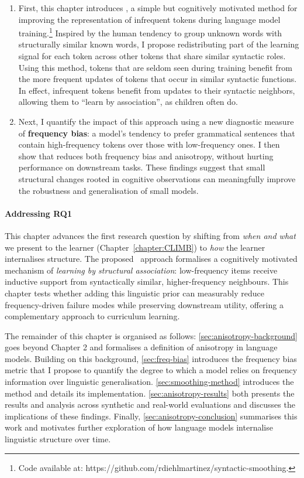 \begin{enumerate}
    \item First, this chapter introduces \smoothing, a simple but cognitively motivated method for improving the representation of infrequent tokens during language model training.\footnote{Code available at: https://github.com/rdiehlmartinez/syntactic-smoothing.} Inspired by the human tendency to group unknown words with structurally similar known words, I propose redistributing part of the learning signal for each token across other tokens that share similar syntactic roles. Using this method, tokens that are seldom seen during training benefit from the more frequent updates of tokens that occur in similar syntactic functions.  In effect, infrequent tokens benefit from updates to their syntactic neighbors, allowing them to ``learn by association'', as children often do.
    \item Next, I quantify the impact of this approach using a new diagnostic measure of \textbf{frequency bias}: a model's tendency to prefer grammatical sentences that contain high-frequency tokens over those with low-frequency ones. I then show that \smoothing reduces both frequency bias and anisotropy, without hurting performance on downstream tasks. These findings suggest that small structural changes rooted in cognitive observations can meaningfully improve the robustness and generalisation of small models.
     
\end{enumerate}

\paragraph{Addressing RQ1} This chapter advances the first research question by shifting from \emph{when and what} we present to the learner (Chapter~\ref{chapter:CLIMB}) to \emph{how} the learner internalises structure. The proposed \smoothing\ approach formalises a cognitively motivated mechanism of \emph{learning by structural association}: low-frequency items receive inductive support from syntactically similar, higher-frequency neighbours. This chapter tests whether adding this linguistic prior can measurably reduce frequency-driven failure modes while preserving downstream utility, offering a complementary approach to curriculum learning.

\vspace{1em}

The remainder of this chapter is organised as follows: \cref{sec:anisotropy-background} goes beyond Chapter 2 and formalises a definition of anisotropy in language models. Building on this background, \cref{sec:freq-bias} introduces the frequency bias metric that I propose to quantify the degree to which a model relies on frequency information over linguistic generalisation. \cref{sec:smoothing-method} introduces the \smoothing method and details its implementation. \cref{sec:anisotropy-results} both presents the results and analysis across synthetic and real-world evaluations and discusses the implications of these findings. Finally, \cref{sec:anisotropy-conclusion} summarises this work and motivates further exploration of how language models internalise linguistic structure over time.

